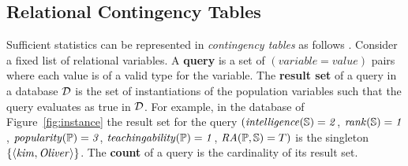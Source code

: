 \documentclass{acm_proc_article-sp}
\newcommand{\ct}{\mathit{ct}}
\begin{document}
\subsection{Relational Contingency Tables}


Sufficient statistics can be represented in {\em contingency tables} as follows \cite{Moore1998}. 
Consider a fixed list of relational variables.
A \textbf{query} is a set of $(variable = value)$ pairs where each value is of a valid type for the variable. 
The \textbf{result set} of a query in a database $\D$ is the set of instantiations of the population variables such that the query evaluates as true in $\D$.
For example, in the database of Figure~\ref{fig:instance} the result set for the query 
$(\it{intelligence}(\S) = 2$, $\it{rank}(\S) = 1$, $\it{popularity}(\P) = 3$, $\it{teachingability}(\P) = 1$, $\ra(\P,\S) = T)$ 
is the singleton $\{\langle \it{kim}, \it{Oliver}\rangle\}$. 
The \textbf{count} of a query is the cardinality of its result set. 
\end{document}
